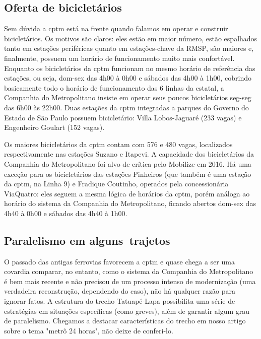 \documentclass[11pt,fleqn]{book} %
\begin{document}
\subsection{Oferta de bicicletários}

Sem dúvida a \gls{cptm} está na frente quando falamos em operar e construir bicicletários. Os motivos são claros: eles estão em maior número, estão espalhados tanto em estações periféricas quanto em estações-chave da RMSP, são maiores e, finalmente, possuem um horário de funcionamento muito mais confortável. Enquanto os bicicletários da \gls{cptm} funcionam no mesmo horário de referência das estações, ou seja, dom-sex das 4h00 à 0h00 e sábados das 4h00 à 1h00, cobrindo basicamente todo o horário de funcionamento das 6 linhas da estatal, a Companhia do Metropolitano insiste em operar seus poucos bicicletários seg-seg das 6h00 às 22h00. Duas estações da \gls{cptm} integradas a parques do Governo do Estado de São Paulo possuem bicicletário: Villa Lobos-Jaguaré (233 vagas) e Engenheiro Goulart (152 vagas).

Os maiores bicicletários da \gls{cptm} contam com 576 e 480 vagas, localizados respectivamente nas estações Suzano e Itapevi. A capacidade dos bicicletários da Companhia do Metropolitano foi alvo de crítica pelo Mobilize em 2016. Há uma exceção para os bicicletários das estações Pinheiros (que também é uma estação da \gls{cptm}, na Linha 9) e Fradique Coutinho, operados pela concessionária ViaQuatro: eles seguem a mesma lógica de horários da \gls{cptm}, porém análoga ao horário do sistema da Companhia do Metropolitano, ficando abertos dom-sex das 4h40 à 0h00 e sábados das 4h40 à 1h00.

\subsection{Paralelismo em alguns trajetos}

O passado das antigas ferrovias favorecem a \gls{cptm} e quase chega a ser uma covardia comparar, no entanto, como o sistema da Companhia do Metropolitano é bem mais recente e não precisou de um processo intenso de modernização (uma verdadeira reconstrução, dependendo do caso), não há qualquer razão para ignorar fatos. A estrutura do trecho Tatuapé-Lapa possibilita uma série de estratégias em situações específicas (como greves), além de garantir algum grau de paralelismo. Chegamos a destacar características do trecho em nosso artigo sobre o tema "metrô 24 horas", não deixe de conferi-lo.
\end{document}
